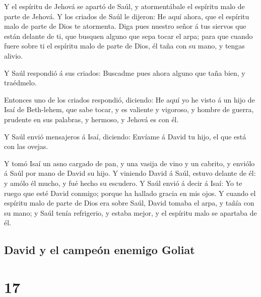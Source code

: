  Y el espíritu de Jehová se apartó de Saúl, y
atormentábale el espíritu malo de parte de Jehová.  Y los
criados de Saúl le dijeron: He aquí ahora, que el espíritu malo de parte
de Dios te atormenta.  Diga pues nuestro señor á tus
siervos que están delante de ti, que busquen alguno que sepa tocar el
arpa; para que cuando fuere sobre ti el espíritu malo de parte de Dios,
él taña con su mano, y tengas alivio.

 Y Saúl respondió á sus criados: Buscadme pues ahora
alguno que taña bien, y traédmelo.

 Entonces uno de los criados respondió, diciendo: He aquí
yo he visto á un hijo de Isaí de Beth-lehem, que sabe tocar, y es
valiente y vigoroso, y hombre de guerra, prudente en sus palabras, y
hermoso, y Jehová es con él.

 Y Saúl envió mensajeros á Isaí, diciendo: Envíame á
David tu hijo, el que está con las ovejas.

 Y tomó Isaí un asno cargado de pan, y una vasija de vino
y un cabrito, y enviólo á Saúl por mano de David su hijo.
 Y viniendo David á Saúl, estuvo delante de él: y amólo
él mucho, y fué hecho su escudero.  Y Saúl envió á decir
á Isaí: Yo te ruego que esté David conmigo; porque ha hallado gracia en
mis ojos.  Y cuando el espíritu malo de parte de Dios era
sobre Saúl, David tomaba el arpa, y tañía con su mano; y Saúl tenía
refrigerio, y estaba mejor, y el espíritu malo se apartaba de él.

\hypertarget{david-y-el-campeuxf3n-enemigo-goliat}{%
\subsection{David y el campeón enemigo
Goliat}\label{david-y-el-campeuxf3n-enemigo-goliat}}

\hypertarget{section-16}{%
\section{17}\label{section-16}}

